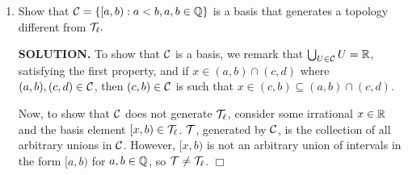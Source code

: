 \documentclass{article}
\begin{document}
\begin{enumerate}
\begin{enumerate}
        \item Show that $\mathcal{C} = \{[a, b) : a<b, a, b \in \mathbb{Q}\}$ is a basis that generates a topology different from $\mathcal{T}_\ell.$

        {\bf SOLUTION.} To show that $\mathcal{C}$ is a basis, we remark that $\bigcup_{U \in \mathcal{C}} U = \mathbb{R}$, satisfying the first property, and if $x \in (a, b) \cap (c, d)$ where $(a, b), (c, d) \in \mathcal{C}$, then $(c, b) \in \mathcal{C}$ is such that $x \in (c, b) \subseteq (a, b) \cap (c, d)$.

        Now, to show that $\mathcal{C}$ does not generate $\mathcal{T}_\ell$, consider some irrational $x \in \mathbb{R}$ and the basis element $[x, b) \in \mathcal{T}_\ell$. $\mathcal{T}$, generated by $\mathcal{C}$, is the collection of all arbitrary unions in $\mathcal{C}$. However, $[x, b)$ is not an arbitrary union of intervals in the form $[a, b)$ for $a, b \in \mathbb{Q}$, so $\mathcal{T} \neq \mathcal{T}_\ell$. $\Box$
    \end{enumerate}
\end{enumerate}
\end{document}
